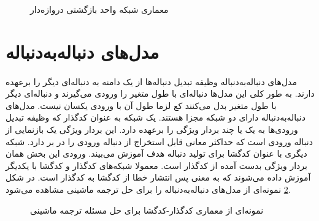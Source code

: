 {    \begin{figure}[H]
        \caption{معماری شبکه واحد بازگشتی دروازه‌دار}
        \label{fig:gru_1}
    \end{figure}
}
\section{مدل‌های دنباله‌به‌دنباله}
\label{sec:seq2seq}
\paragraph{}{
    مدل‌های دنباله‌به‌دنباله وظیفه تبدیل دنباله‌ها از یک دامنه به دنباله‌ای دیگر 
    را برعهده دارند. به طور کلی این مدل‌ها دنباله‌ای با طول متغیر را ورودی می‌گیرند و
    دنباله‌ای دیگر با طول متغیر بدل می‌کنند کع لزما طول آن با ورودی یکسان نیست. 
    مدل‌های دنباله‌به‌دنباله دارای دو شبکه مجزا هستند. یک شبکه به عنوان کدگذار
    که وظیفه تبدیل ورودی‌ها به یک یا چند بردار ویژگی را برعهده دارد. 
    این بردار ویژگی یک بازنمایی از دنباله ورودی است که حداکثر معانی قابل
    استخراج از دنباله ورودی را در بر دارد. شبکه دیگری با عنوان کدگشا 
    برای تولید دنباله هدف آموزش می‌بیند. ورودی این بخش همان بردار ویژگی 
    بدست آمده از کدگذار است. معمولا شبکه‌های کدگذار و کدگشا با یکدیگر آموزش
    داده می‌شوند که به معنی پس انتشار خطا از کدگشا به کدگذار است. در شکل
    \ref{fig:enc_dec_1}
    نمونه‌ای از مدل‌های دنباله‌به‌دنباله را برای حل ترجمه ماشینی مشاهده می‌شود. 
    \begin{figure}[H]
        \caption{نمونه‌ای از معماری‌ کدگذار-کدگشا برای حل مسئله ترجمه ماشینی}
        \label{fig:enc_dec_1}
    \end{figure}
}
